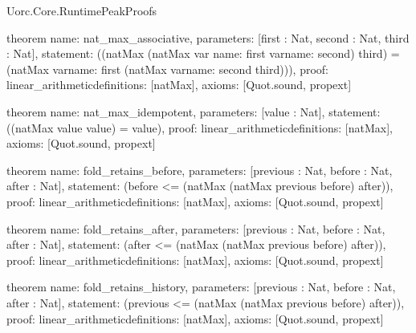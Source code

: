 \begin{lexlean}{Uorc.Core.RuntimePeakProofs}
\begin{semanticmodule}
theorem{
  name: nat_max_associative,
  parameters: [first : Nat, second : Nat, third : Nat],
  statement: ((natMax (natMax var{
    name: first
  } var{name: second}) third) = (natMax var{name: first} (natMax var{name: second} third))),
  proof: linear_arithmetic{definitions: [natMax]},
  axioms: [Quot.sound, propext]
}

theorem{
  name: nat_max_idempotent,
  parameters: [value : Nat],
  statement: ((natMax value value) = value),
  proof: linear_arithmetic{definitions: [natMax]},
  axioms: [Quot.sound, propext]
}

theorem{
  name: fold_retains_before,
  parameters: [previous : Nat, before : Nat, after : Nat],
  statement: (before <= (natMax (natMax previous before) after)),
  proof: linear_arithmetic{definitions: [natMax]},
  axioms: [Quot.sound, propext]
}

theorem{
  name: fold_retains_after,
  parameters: [previous : Nat, before : Nat, after : Nat],
  statement: (after <= (natMax (natMax previous before) after)),
  proof: linear_arithmetic{definitions: [natMax]},
  axioms: [Quot.sound, propext]
}

theorem{
  name: fold_retains_history,
  parameters: [previous : Nat, before : Nat, after : Nat],
  statement: (previous <= (natMax (natMax previous before) after)),
  proof: linear_arithmetic{definitions: [natMax]},
  axioms: [Quot.sound, propext]
}


\end{semanticmodule}
\end{lexlean}
